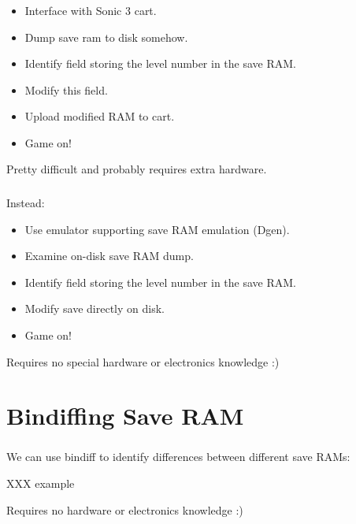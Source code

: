 \documentclass{beamer}
\begin{document}
\begin{frame}[fragile]
\frametitle{\insertsection}

\begin{itemize}
\item Interface with Sonic 3 cart.
\item Dump save ram to disk somehow.
\item Identify field storing the level number in the save RAM.
\item Modify this field.
\item Upload modified RAM to cart.
\item Game on!
\end{itemize}

\pause
\vfill

Pretty difficult and probably requires extra hardware.

\end{frame}

\begin{frame}[fragile]
\frametitle{\insertsection}

Instead:

\begin{itemize}
\item Use emulator supporting save RAM emulation (Dgen).
\item Examine on-disk save RAM dump.
\item Identify field storing the level number in the save RAM.
\item Modify save directly on disk.
\item Game on!
\end{itemize}

\vfill

Requires no special hardware or electronics knowledge :)

\end{frame}


\section{Bindiffing Save RAM}

\begin{frame}[fragile]
\frametitle{\insertsection}

We can use bindiff to identify differences between different save RAMs:

XXX example

\vfill

Requires no hardware or electronics knowledge :)

\end{frame}
\end{document}
